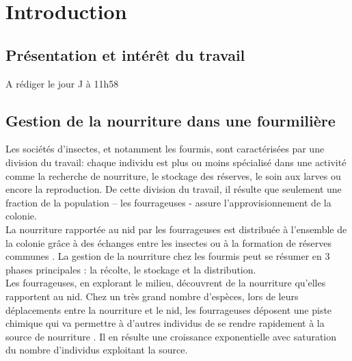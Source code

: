 \chapter{Introduction}

\section{Présentation et intérêt du travail}
A rédiger le jour J à 11h58


\section{Gestion de la nourriture dans une fourmilière}

Les sociétés d'insectes, et notamment les fourmis, sont caractérisées par une division du travail: chaque individu est plus ou moins spécialisé dans une activité comme la recherche de nourriture, le stockage des réserves, le soin aux larves ou encore la reproduction. De cette division du travail, il résulte que seulement une fraction de la population – les fourrageuses - assure l'approvisionnement de la colonie.\\

La nourriture rapportée au nid par les fourrageuses est distribuée à l'ensemble de la colonie grâce à des échanges entre les insectes ou à la formation de réserves communes \citep{holldobler_ants_1990,passera_les_2005}. La gestion de la nourriture chez les fourmis peut se résumer en 3 phases principales : la récolte, le stockage et la distribution.\\

Les fourrageuses, en explorant le milieu, découvrent de la nourriture qu'elles rapportent au nid. Chez un très grand nombre d'espèces, lors de leurs déplacements entre la nourriture et le nid, les fourrageuses déposent une piste chimique qui va permettre à d'autres individus de se rendre rapidement à la source de nourriture \citep{camazine_self-organization_2003}. Il en résulte une croissance exponentielle avec saturation du nombre d'individus exploitant la source.\\

